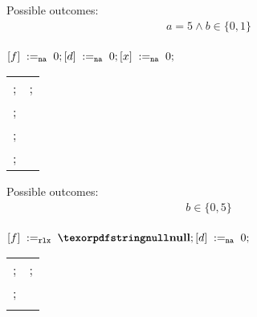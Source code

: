 \begin{minipage}[t]{0.3\linewidth}
Possible outcomes:\\
\[\begin{array}{l}
a = 5 \land b \in \{0, 1\} \\
\end{array}\]
\end{minipage}
%
\codePrefix
  $[f] \;:=_{\mathtt{na}}\;0; [d] \;:=_{\mathtt{na}}\;0; [x] \;:=_{\mathtt{na}}\;0;$ \\
  \begin{tabular}{L || L}
    ;  & ; \\
    ; & \\
    ; & \\
    ; & \\
  \end{tabular}
\codePostfix
\litmusTestEnd

\begin{minipage}[t]{0.3\linewidth}
Possible outcomes:\\
\[\begin{array}{l}
b \in \{0, 5\} \\
\end{array}\]
\end{minipage}
%
\codePrefix
  $\writeInstParam{\rlx}{f}{\nullPtr}; \writeInstParam{\na}{d}{0};$ \\
  \begin{tabular}{L || L}
    ;  & ; \\
    ; &
      \begin{array}{@{}l}
        {}
        {} \\
      \end{array}
  \end{tabular}
\codePostfix
\litmusTestEnd

